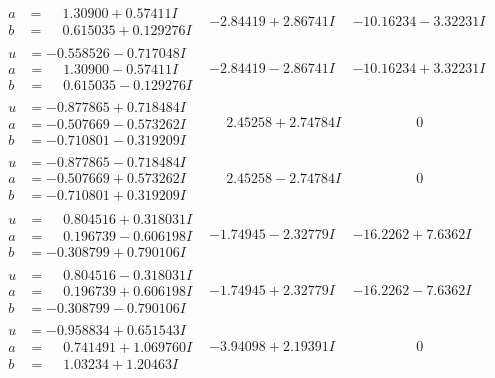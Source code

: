 \documentclass[1p]{elsarticle_modified}
\theoremstyle{definition}
\begin{document}
$$\begin{array}{c|c|c}
\begin{aligned}
a &= \phantom{-}1.30900 + 0.57411 I \\
b &= \phantom{-}0.615035 + 0.129276 I\end{aligned}
 & -2.84419 + 2.86741 I & -10.16234 - 3.32231 I \\ \hline\begin{aligned}
u &= -0.558526 - 0.717048 I \\
a &= \phantom{-}1.30900 - 0.57411 I \\
b &= \phantom{-}0.615035 - 0.129276 I\end{aligned}
 & -2.84419 - 2.86741 I & -10.16234 + 3.32231 I \\ \hline\begin{aligned}
u &= -0.877865 + 0.718484 I \\
a &= -0.507669 - 0.573262 I \\
b &= -0.710801 - 0.319209 I\end{aligned}
 & \phantom{-}2.45258 + 2.74784 I & \phantom{-0.000000 } 0 \\ \hline\begin{aligned}
u &= -0.877865 - 0.718484 I \\
a &= -0.507669 + 0.573262 I \\
b &= -0.710801 + 0.319209 I\end{aligned}
 & \phantom{-}2.45258 - 2.74784 I & \phantom{-0.000000 } 0 \\ \hline\begin{aligned}
u &= \phantom{-}0.804516 + 0.318031 I \\
a &= \phantom{-}0.196739 - 0.606198 I \\
b &= -0.308799 + 0.790106 I\end{aligned}
 & -1.74945 - 2.32779 I & -16.2262 + 7.6362 I \\ \hline\begin{aligned}
u &= \phantom{-}0.804516 - 0.318031 I \\
a &= \phantom{-}0.196739 + 0.606198 I \\
b &= -0.308799 - 0.790106 I\end{aligned}
 & -1.74945 + 2.32779 I & -16.2262 - 7.6362 I \\ \hline\begin{aligned}
u &= -0.958834 + 0.651543 I \\
a &= \phantom{-}0.741491 + 1.069760 I \\
b &= \phantom{-}1.03234 + 1.20463 I\end{aligned}
 & -3.94098 + 2.19391 I & \phantom{-0.000000 } 0 \\ \hline\begin{aligned}

\end{aligned}
\end{array}$$
\end{document}
